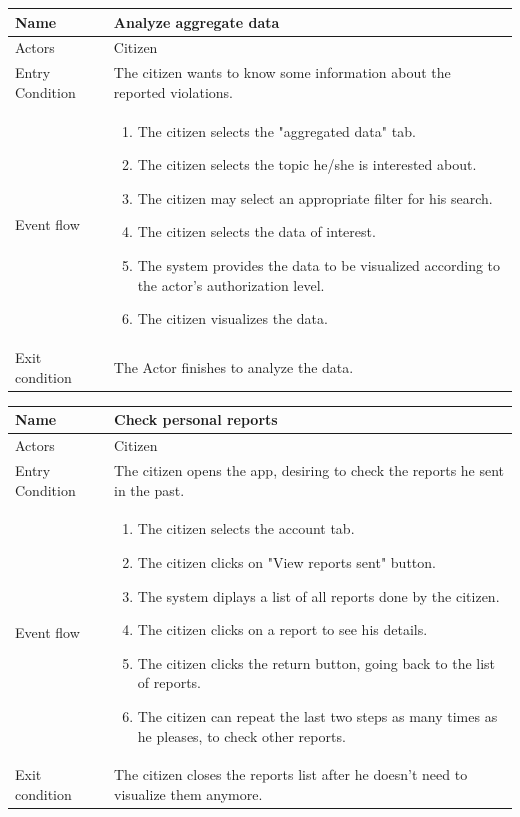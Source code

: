 \vskip 0.2in
\begin{tabular}{|p{3.1cm}|p{11.6cm}|}
\hline
Name & Analyze aggregate data\\
\hline
Actors & Citizen\\
\hline
Entry Condition & The citizen wants to know some information about the reported violations.\\
\hline
Event flow & \begin{enumerate}
                \item The citizen selects the "aggregated data" tab.
                \item The citizen selects the topic he/she is interested about.
                \item The citizen may select an appropriate filter for his search.
                \item The citizen selects the data of interest.
                \item The system provides the data to be visualized according to the actor's authorization level.
                \item The citizen visualizes the data.
            \end{enumerate}\\
\hline
Exit condition & The Actor finishes to analyze the data.\\
\hline
\end{tabular}

\vskip 0.2in
\begin{tabular}{|p{3.1cm}|p{11.6cm}|}
	\hline
	Name & Check personal reports\\
	\hline
	Actors & Citizen\\
	\hline
	Entry Condition & The citizen opens the app, desiring to check the reports he sent in the past.\\
	\hline
	Event flow & \begin{enumerate}
		\item The citizen selects the account tab.
		\item The citizen clicks on "View reports sent" button.
		\item The system diplays a list of all reports done by the citizen.
		\item The citizen clicks on a report to see his details.
		\item The citizen clicks the return button, going back to the list of reports.
		\item The citizen can repeat the last two steps as many times as he pleases, to check other reports.
	\end{enumerate}\\
	\hline
	Exit condition & The citizen closes the reports list after he doesn't need to visualize them anymore.\\
	\hline
\end{tabular}

